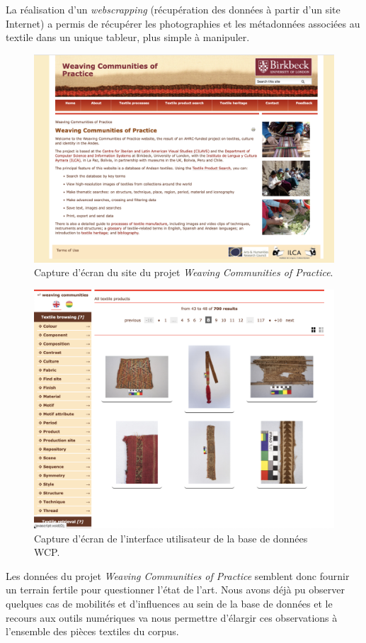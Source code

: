 La réalisation d'un \textit{webscrapping} (récupération des données à partir d'un site Internet) a permis de récupérer les photographies et les métadonnées associées au textile dans un unique tableur, plus simple à manipuler.\clearpage

\begin{figure}[!ht]
       \begin{center}
        		\includegraphics[width=12cm]{../images/screenWCP.png}
		\caption{Capture d'écran du site du projet \textit{Weaving Communities of Practice}.}
	\label{fig:WCP}
	\end{center}
\end{figure}

\begin{figure}[!ht]
       \begin{center}
        		\includegraphics[width=12cm]{../images/screenWCPSearch.png}
		\caption{Capture d'écran de l'interface utilisateur de la base de données WCP.}
	\label{fig:WCPSearch}
	\end{center}
\end{figure}

Les données du projet \textit{Weaving Communities of Practice} semblent donc fournir un terrain fertile pour questionner l'état de l'art. Nous avons déjà pu observer quelques cas de mobilités et d'influences au sein de la base de données et le recours aux outils numériques va nous permettre d'élargir ces observations à l'ensemble des pièces textiles du corpus. 

